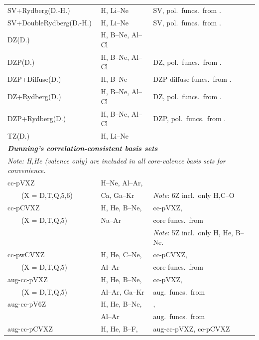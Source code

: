 \begin{longtable}{lll}
SV+Rydberg(D.-H.) & H, Li--Ne & SV, pol.\ funcs.\ from
  \cite{thdpjhhfs1977-2}.\\
\small{SV+DoubleRydberg(D.-H.)} & H, Li--Ne & SV, pol.\ funcs.\ from
  \cite{thdpjhhfs1977-2}.\\
DZ(D.) & H, B--Ne, Al--Cl & \cite{thdjcp53,thdpjhhfs1977} \\
DZP(D.) & H, B--Ne, Al--Cl & DZ, pol.\ funcs.\ from 
  \cite{thdpjhhfs1977,emhfsjcp83}.\\
DZP+Diffuse(D.) & H, B--Ne & DZP diffuse funcs.\ from
  \cite{thdpjhhfs1977,emhfsjcp83}.\\
DZ+Rydberg(D.) & H, B--Ne, Al--Cl & DZ, pol.\ funcs.\ from
  \cite{thdpjhhfs1977-2}.\\
DZP+Rydberg(D.) & H, B--Ne, Al--Cl & DZP, pol.\ funcs.\ from 
  \cite{thdpjhhfs1977-2}.\\
TZ(D.) & H, Li--Ne & \cite{thdjcp55}\\
\hline
\multicolumn{3}{l}{\bf{\emph{Dunning's correlation-consistent basis 
sets\index{basis set!correlation-consistent}\index{correlation-consistent basis set}}}} \\
\multicolumn{3}{l}{\emph{Note: H,He (valence only) are included in all core-valence basis sets 
  for convenience.}} \\
cc-pVXZ & H--Ne, Al--Ar, & \cite{thdjcp90,dewthdjcp100,dewthdjcp98,
  jkkapjpca106,akwdewkapthdjcp110} \\
 ~~~~(X = D,T,Q,5,6) & Ca, Ga--Kr & \emph{Note}: 6Z incl.\ only H,C--O\\
cc-pCVXZ & H, He, B--Ne, & cc-pVXZ,  \\
 ~~~~(X = D,T,Q,5) & Na--Ar & core funcs.\ from
   \cite{thdjcp90,jkkapjpca106,dewthdjcp103} \\
 				   & & \emph{Note}: 5Z incl.\ only H, He, B--Ne. \\
cc-pwCVXZ & H, He, C--Ne,  & cc-pCVXZ, \\
 ~~~~(X = D,T,Q,5) & Al--Ar &  core funcs.\ from \cite{thdjcp90,kapthdjcp117} \\
aug-cc-pVXZ & H, He, B--Ne, & cc-pVXZ,\\
 ~~~~(X = D,T,Q,5) & Al--Ar, Ga--Kr &  aug.\ funcs.\ from 
   \cite{thdjcp90,rakthdrjhjcp96,dewthdjcp98,dewthdjcp100} \\
aug-cc-pV6Z & H, He, B--Ne, & \cite{akwtvmthdjsm388,tmakwtdhmp96}, \\
  & Al--Ar & aug.\ funcs.\ from 
    \cite{akwtvmthdjsm388,tmakwtdhmp96,tmthdijqc76} \\
aug-cc-pCVXZ & H, He, B--F, & aug-cc-pVXZ, cc-pCVXZ \\

\end{longtable}
